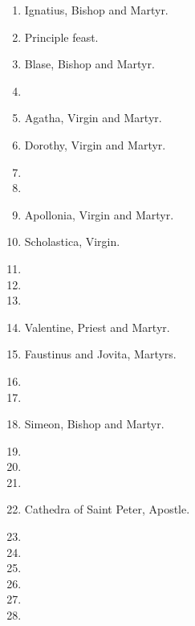 	
	\begin{enumerate}
		
		\item Ignatius, Bishop and Martyr. 
		\item {} Principle feast.
		\item Blase, Bishop and Martyr. 
		\item %
		\item Agatha, Virgin and Martyr. 
		\item Dorothy, Virgin and Martyr.
		\item %
		\item %
		\item Apollonia, Virgin and Martyr.
		\item Scholastica, Virgin. 
		\item %
		\item %
		\item %
		\item Valentine, Priest and Martyr. 
		\item Faustinus and Jovita, Martyrs.
		\item %
		\item %
		\item Simeon, Bishop and Martyr. 
		\item %
		\item %
		\item %
		\item Cathedra of Saint Peter, Apostle. 
		\item %
		\item %
		\item %
		\item %
		\item %
		\item %
	\end{enumerate}
	
	
